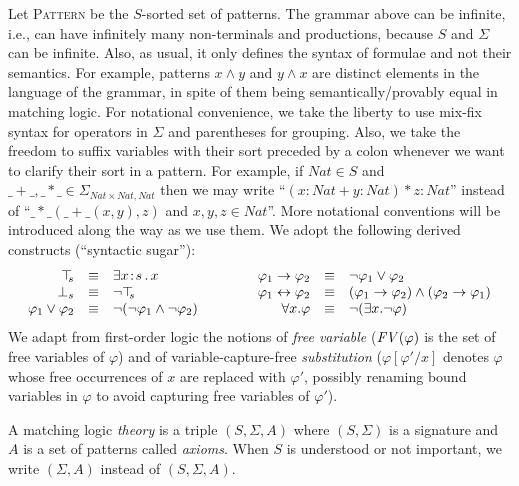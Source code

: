 \documentclass[UTF8,11pt]{article}
\theoremstyle{plain}
\theoremstyle{definition}
\theoremstyle{remark}
\newcommand{\cln}{{:}}
\newcommand{\Nat}{\textit{Nat}}
\newcommand{\Pattern}{\textsc{Pattern}\xspace}
\newcommand{\ra}{\rightarrow}
\newcommand{\lra}{\leftrightarrow}
\newcommand{\FV}{{\it FV}}
\begin{document}
Let \Pattern be the $S$-sorted set of patterns.
The grammar above can be infinite, i.e., can have infinitely many
non-terminals and productions, because $S$ and $\Sigma$ can be
infinite.
Also, as usual, it only defines the syntax of formulae and not
their semantics.
For example, patterns $x \wedge y$ and $y \wedge x$ are distinct elements in
the language of the grammar, in spite of them being semantically/provably
equal in matching logic.
For notational convenience, we take the liberty to use mix-fix syntax for
operators in $\Sigma$ and parentheses for grouping.
Also, we take the freedom to suffix variables with their sort preceded
by a colon whenever we want to clarify their sort in a pattern.
For example, if $\Nat \in S$ and
$\_+\_, \_*\_ \in \Sigma_{\Nat \times \Nat, \Nat}$
then we may write ``$(x\cln\Nat + y\cln\Nat)*z\cln\Nat$'' instead of
``$\_*\_(\_+\_(x,y),z)$ and $x,y,z\in\Nat$''.
More notational conventions will be introduced along the way
as we use them. 
We adopt the following derived constructs (``syntactic sugar''): %
$$\begin{array}{rcl@{\hspace*{10ex}}rcl}
\top_{\!\!s} & \equiv & \exists x\!:\!s \,.\, x &
\varphi_1 \ra \varphi_2 & \equiv & \neg\varphi_1 \vee \varphi_2 \\
\bot_{s} & \equiv & \neg \top_{\!\!s} &
\varphi_1 \lra \varphi_2 & \equiv & (\varphi_1 \ra \varphi_2) \wedge
 (\varphi_2 \ra \varphi_1) \\
\varphi_1 \vee \varphi_2 & \equiv & \neg(\neg\varphi_1\wedge\neg\varphi_2) &
\forall x . \varphi & \equiv & \neg(\exists x . \neg\varphi) \\
\end{array}
$$
We adapt from first-order logic the notions of \emph{free variable}
($\FV(\varphi)$ is the set of free variables of $\varphi$) and of
variable-capture-free \emph{substitution} ($\varphi[\varphi'/x]$ denotes
$\varphi$ whose free occurrences of $x$ are replaced with $\varphi'$, possibly
renaming bound variables in $\varphi$ to avoid capturing free variables of
$\varphi'$).

A matching logic \emph{theory} is a triple $(S, \Sigma, A)$ where
$(S,\Sigma)$ is a signature and $A$ is a set of patterns called \emph{axioms}.
When $S$ is understood or not important, we write $(\Sigma,A)$ instead of $(S,\Sigma,A)$.
\end{document}
